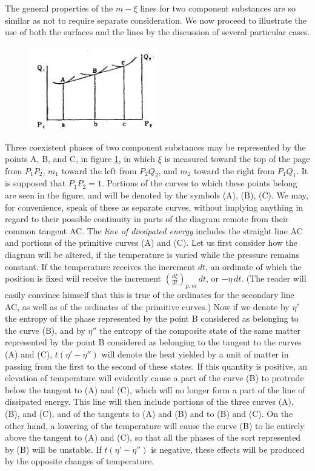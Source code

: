 \documentclass[12pt]{memoir}
\begin{document}
The general properties of the $m\!-\xi$ lines for two component substances are so similar as not to require separate consideration. We now proceed to illustrate the use of both the surfaces and the lines by the discussion of several particular cases.


\begin{figure} %
    \centering
    \includegraphics[width=0.5\textwidth]{fig_1}
    \caption{ }
    \label{fig_1}
\end{figure}
Three coexistent phases of two component substances may be represented by the points A, B, and C, in figure \ref{fig_1}, in which $\xi$ is  measured toward the top of the page from $P_1 P_2$, $m_1$ toward the left from $P_2 Q_2$, and $m_2$ toward the right from $P_1 Q_1$. It is supposed that $P_1 P_2= 1$. Portions of the curves to which these points belong are seen in the figure, and will be denoted by the symbols (A), (B), (C). We may, for convenience, speak of these as separate curves, without implying anything in regard to their possible continuity in parts of the diagram remote from their common tangent AC. The \textit{line of dissipated energy} includes the straight line AC and portions of the primitive curves (A) and (C). Let us first consider how the diagram will be altered, if the temperature is varied while the pressure remains constant. If the temperature receives the increment $dt$, an ordinate of which the position is fixed will receive the increment $\left( \frac{d \xi}{dt}\right)_{p,m} \, dt$, or $-\eta \, dt$. (The reader will easily convince himself that this is true of the ordinates for the secondary line AC, as well as of the ordinates of the primitive curves.) Now if we denote by $\eta'$ the entropy of the phase represented by the point B considered as belonging to the curve (B), and by $\eta''$ the entropy of the composite state of the same matter represented by the
point B considered as belonging to the tangent to the curves (A) and (C), $t(\eta'-\eta'')$ will denote the heat yielded by a unit of matter in passing from the first to the second of these states. If this quantity is positive, an elevation of temperature will evidently cause a part of the curve (B) to protrude below the tangent to (A) and (C), which will no longer form a part of the line of dissipated energy. This line will then include portions of the three curves (A), (B), and (C), and of the tangents to (A) and (B) and to (B) and (C). On the other hand, a lowering of the temperature will cause the curve (B) to lie entirely above the tangent to (A) and (C), so that all the phases of the sort represented by (B) will be unstable. If $t(\eta'- \eta'')$ is negative, these effects will be produced by the opposite changes of temperature.
\end{document}
